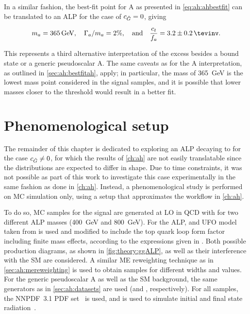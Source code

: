 In a similar fashion, the best-fit point for A as presented in \cref{eq:ah:ahbestfit} can be translated to an ALP for the case of $c_{\tilde{G}} = 0$, giving

\begin{equation*}
    m_a = \SI{365}{\GeV}, \quad \Gamma_a / m_a = 2\%, \quad \text{and} \quad \frac{\ct}{f_a} = 3.2 \pm 0.2 \, \si{\tevinv}.
\end{equation*}

This represents a third alternative interpretation of the excess besides a \ttbar bound state or a generic pseudoscalar A. The same caveats as for the A interpretation, as outlined in \cref{sec:ah:bestfitah}, apply; in particular, the mass of \SI{365}{\GeV} is the lowest mass point considered in the signal samples, and it is possible that lower masses closer to the \ttbar threshold would result in a better fit.

\section{Phenomenological setup}
\label{sec:alps:setup}

The remainder of this chapter is dedicated to exploring an ALP decaying to \ttbar for the case $c_{\tilde{G}} \neq 0$, for which the results of \cref{ch:ah} are not easily translatable since the distributions are expected to differ in shape. Due to time constraints, it was not possible as part of this work to investigate this case experimentally in the same fashion as done in \cref{ch:ah}. Instead, a phenomenological study is performed on MC simulation only, using a setup that approximates the workflow in \cref{ch:ah}.

To do so, MC samples for the signal are generated at LO in QCD with \madgraph for two different ALP masses (\SI{400}{\GeV} and \SI{800}{\GeV}). For the ALP, and UFO model taken from  is used and modified to include the top quark loop form factor including finite mass effects, according to the expressions given in . Both possible production diagrams, as shown in \cref{fig:theory:ggALP}, as well as their interference with the SM are considered. A similar ME reweighting technique as in \cref{sec:ah:mereweighting} is used to obtain samples for different widths and \cG values. For the generic pseudoscalar A as well as the SM \ttbar background, the same generators as in \cref{sec:ah:datasets} are used (\madgraph and \powhegvtwo \hvq, respectively). For all samples, the NNPDF~3.1 PDF set~\cite{NNPDF:2017mvq} is used, and  is used to simulate initial and final state radiation~\cite{Pythia:2015}.

